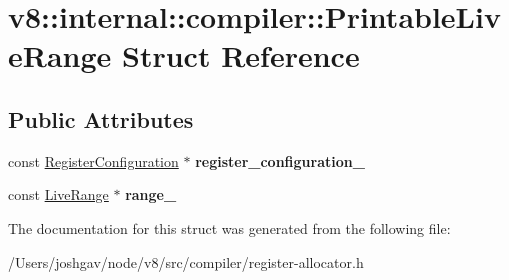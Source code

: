 \hypertarget{structv8_1_1internal_1_1compiler_1_1_printable_live_range}{}\section{v8\+:\+:internal\+:\+:compiler\+:\+:Printable\+Live\+Range Struct Reference}
\label{structv8_1_1internal_1_1compiler_1_1_printable_live_range}
\subsection*{Public Attributes}
\begin{DoxyCompactItemize}
\item 
const \hyperlink{classv8_1_1internal_1_1_register_configuration}{Register\+Configuration} $\ast$ {\bfseries register\+\_\+configuration\+\_\+}\hypertarget{structv8_1_1internal_1_1compiler_1_1_printable_live_range_aa79d6fdb18ee5834ecdee53a75cd7a94}{}\label{structv8_1_1internal_1_1compiler_1_1_printable_live_range_aa79d6fdb18ee5834ecdee53a75cd7a94}

\item 
const \hyperlink{classv8_1_1internal_1_1compiler_1_1_live_range}{Live\+Range} $\ast$ {\bfseries range\+\_\+}\hypertarget{structv8_1_1internal_1_1compiler_1_1_printable_live_range_a1b6c54bec4e26d51ff3c40bb1154c1b9}{}\label{structv8_1_1internal_1_1compiler_1_1_printable_live_range_a1b6c54bec4e26d51ff3c40bb1154c1b9}

\end{DoxyCompactItemize}


The documentation for this struct was generated from the following file\+:\begin{DoxyCompactItemize}
\item 
/\+Users/joshgav/node/v8/src/compiler/register-\/allocator.\+h\end{DoxyCompactItemize}
